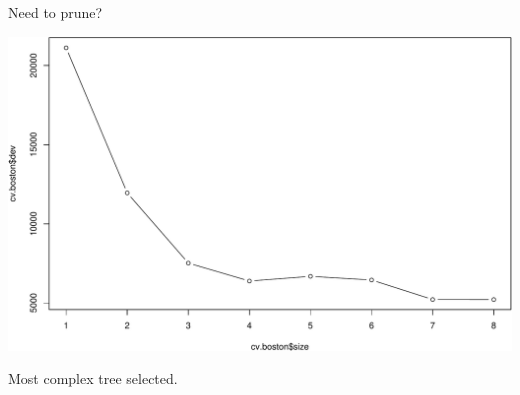 \documentclass[ignorenonframetext,]{beamer}
\newenvironment{Shaded}{\begin{snugshade}}{\end{snugshade}}
\newcommand{\KeywordTok}[1]{\textcolor[rgb]{0.13,0.29,0.53}{\textbf{#1}}}
\newcommand{\DataTypeTok}[1]{\textcolor[rgb]{0.13,0.29,0.53}{#1}}
\newcommand{\StringTok}[1]{\textcolor[rgb]{0.31,0.60,0.02}{#1}}
\newcommand{\OperatorTok}[1]{\textcolor[rgb]{0.81,0.36,0.00}{\textbf{#1}}}
\newcommand{\NormalTok}[1]{#1}
\begin{document}
\begin{frame}[fragile]

\begin{block}{Need to prune?}

\begin{Shaded}
\end{Shaded}

\includegraphics{8TreesBEAMER_files/figure-beamer/unnamed-chunk-40-1.pdf}

Most complex tree selected.

\end{block}

\end{frame}
\end{document}
